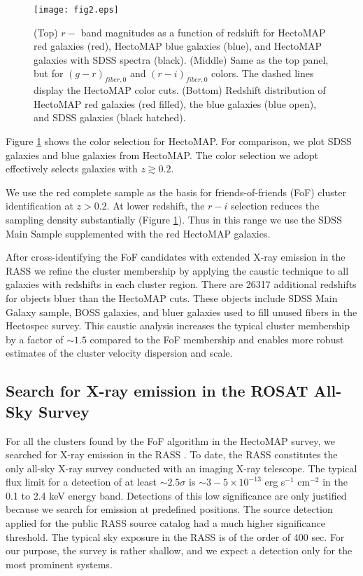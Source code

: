 \documentclass[iop, apj]{emulateapj}
\begin{document}
\begin{figure}
\centering
\texttt{[image: fig2.eps]}
\caption{
(Top) $r-$ band magnitudes as a function of redshift
 for HectoMAP red galaxies (red), 
 HectoMAP blue galaxies (blue), and 
 HectoMAP galaxies with SDSS spectra (black). 
(Middle) Same as the top panel, 
 but for  $(g-r)_{fiber, 0}$ and $(r-i)_{fiber, 0}$ colors. 
 The dashed lines display the HectoMAP color cuts. 
(Bottom) Redshift distribution of HectoMAP red galaxies (red filled), 
 the blue galaxies (blue open), and 
 SDSS galaxies (black hatched).  }
\label{zsample}
\end{figure}


Figure \ref{zsample} shows the color selection for HectoMAP. 
For comparison, 
 we plot SDSS galaxies and blue galaxies from HectoMAP.
The color selection we adopt effectively 
 selects galaxies with $z \gtrsim 0.2$.  

We use the red complete sample as the basis 
 for friends-of-friends (FoF) cluster identification at $z > 0.2$. 
At lower redshift, 
 the $r-i$ selection reduces the sampling density substantially 
 (Figure \ref{zsample}). 
Thus in this range we use the SDSS Main Sample 
 supplemented with the red HectoMAP galaxies.
 
After cross-identifying the FoF candidates with extended X-ray emission in the RASS
 we refine the cluster membership by applying the caustic technique \citep{Diaferio97, Diaferio99b, Serra13} 
 to all galaxies with redshifts in each cluster region. 
There are 26317 additional redshifts for objects bluer than the HectoMAP cuts. 
These objects include SDSS Main Galaxy sample, BOSS galaxies, and bluer galaxies 
 used to fill unused fibers in the Hectospec survey.  
This caustic analysis increases 
 the typical cluster membership by a factor of $\sim1.5$ compared to the FoF membership and
 enables more robust estimates of the cluster velocity dispersion and scale.


\subsection{Search for X-ray emission in the ROSAT All-Sky Survey}\label{rosat}

For all the clusters found by the FoF algorithm in the HectoMAP survey,
 we searched for X-ray emission in the RASS \citep{Trumper93}.
To date, the RASS constitutes the only all-sky X-ray survey 
 conducted with an imaging X-ray telescope. 
The typical flux limit for a detection of at least $\sim 2.5 \sigma$ is 
 $\sim 3 - 5 \times 10^{-13}$ erg s$^{-1}$ cm$^{-2}$ in the 0.1 to 2.4 keV energy band. 
Detections of this low significance are only justified 
 because we search for emission at predefined positions. 
The source detection applied for the public RASS source catalog \citep{Voges99} 
 had a much higher significance threshold. 
The typical sky exposure in the RASS is of the order of 400 sec. 
For our purpose, 
 the survey is rather shallow, 
 and we expect a detection only for the most prominent systems.
\end{document}
